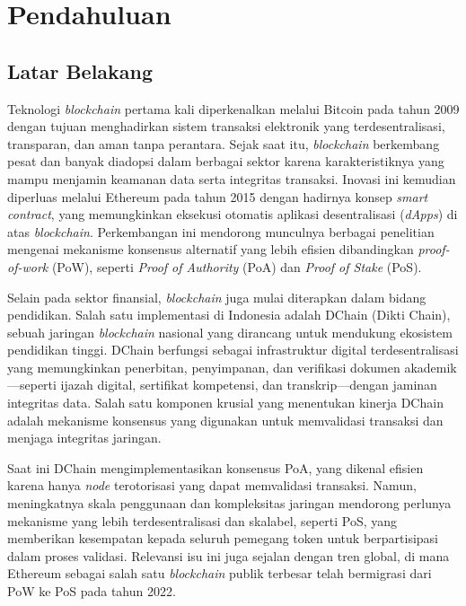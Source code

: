 \chapter{Pendahuluan}

\section{Latar Belakang}

Teknologi \textit{blockchain} pertama kali diperkenalkan melalui Bitcoin pada tahun 2009 dengan tujuan menghadirkan sistem transaksi elektronik yang terdesentralisasi, transparan, dan aman tanpa perantara. Sejak saat itu, \textit{blockchain} berkembang pesat dan banyak diadopsi dalam berbagai sektor karena karakteristiknya yang mampu menjamin keamanan data serta integritas transaksi. Inovasi ini kemudian diperluas melalui Ethereum pada tahun 2015 dengan hadirnya konsep \textit{smart contract}, yang memungkinkan eksekusi otomatis aplikasi desentralisasi (\textit{dApps}) di atas \textit{blockchain}. Perkembangan ini mendorong munculnya berbagai penelitian mengenai mekanisme konsensus alternatif yang lebih efisien dibandingkan \textit{proof-of-work} (PoW), seperti \textit{Proof of Authority} (PoA) dan \textit{Proof of Stake} (PoS).

Selain pada sektor finansial, \textit{blockchain} juga mulai diterapkan dalam bidang pendidikan. Salah satu implementasi di Indonesia adalah DChain (Dikti Chain), sebuah jaringan \textit{blockchain} nasional yang dirancang untuk mendukung ekosistem pendidikan tinggi. DChain berfungsi sebagai infrastruktur digital terdesentralisasi yang memungkinkan penerbitan, penyimpanan, dan verifikasi dokumen akademik—seperti ijazah digital, sertifikat kompetensi, dan transkrip—dengan jaminan integritas data. Salah satu komponen krusial yang menentukan kinerja DChain adalah mekanisme konsensus yang digunakan untuk memvalidasi transaksi dan menjaga integritas jaringan.

Saat ini DChain mengimplementasikan konsensus PoA, yang dikenal efisien karena hanya \textit{node} terotorisasi yang dapat memvalidasi transaksi. Namun, meningkatnya skala penggunaan dan kompleksitas jaringan mendorong perlunya mekanisme yang lebih terdesentralisasi dan skalabel, seperti PoS, yang memberikan kesempatan kepada seluruh pemegang token untuk berpartisipasi dalam proses validasi. Relevansi isu ini juga sejalan dengan tren global, di mana Ethereum sebagai salah satu \textit{blockchain} publik terbesar telah bermigrasi dari PoW ke PoS pada tahun 2022.

